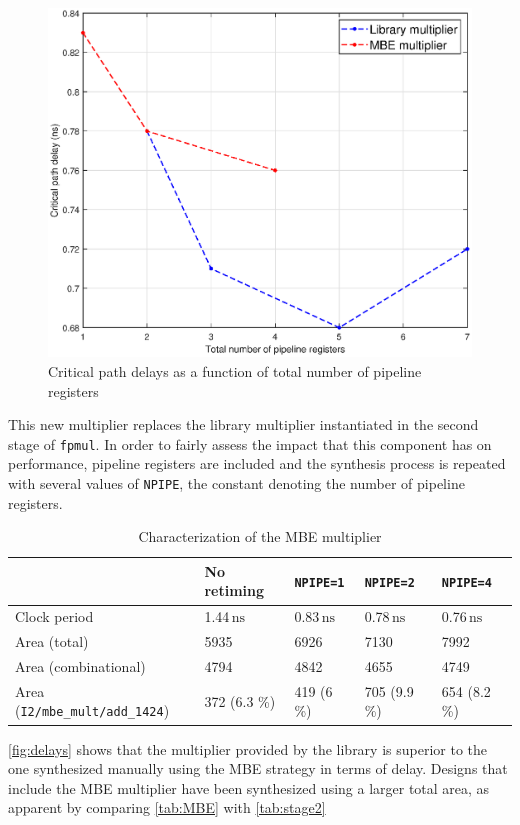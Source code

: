\begin{figure}
	\includegraphics[width=\textwidth]{chapter2/images/delays.eps}
	\caption{Critical path delays as a function of total number of pipeline registers}
	\label{fig:delays}
\end{figure}
This new multiplier replaces the library multiplier instantiated in the second stage of \texttt{fpmul}. In order to fairly assess the impact that this component has on performance, pipeline registers are included and the synthesis process is repeated with several values of \texttt{NPIPE}, the constant denoting the number of pipeline registers.
\begin{table}
\begin{tabular}{|l|l|l|l|l|}\hline
	& No retiming & \texttt{NPIPE=1} & \texttt{NPIPE=2} & \texttt{NPIPE=4}\\\hline
	Clock period & 1.44$\,\textrm{ns}$ & 0.83$\,\textrm{ns}$& 0.78$\,\textrm{ns}$& 0.76$\,\textrm{ns}$ \\\hline
	Area (total) & 5935 & 6926 & 7130 & 7992 \\\hline
	Area (combinational) & 4794 & 4842 & 4655 & 4749 \\\hline
	Area (\texttt{I2/mbe\_mult/add\_1424}) & 372 (6.3 \%)  & 419 (6 \%)  &  705 (9.9 \%)& 654 (8.2 \%)\\\hline
\end{tabular}
\caption{Characterization of the MBE multiplier}
\label{tab:MBE}
\end{table}
\autoref{fig:delays} shows that the multiplier provided by the library is superior to the one synthesized manually using the MBE strategy in terms of delay. Designs that include the MBE multiplier have been synthesized using a larger total area, as apparent by comparing \autoref{tab:MBE} with \autoref{tab:stage2}